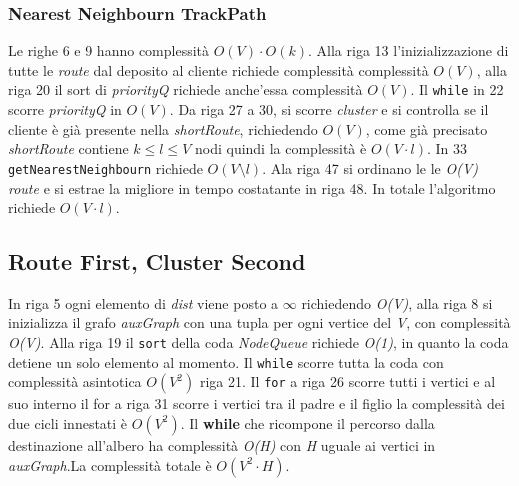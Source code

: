 \documentclass[]{article}
\begin{document}
\subsubsection{Nearest Neighbourn TrackPath}
Le righe 6 e 9 hanno complessità \emph{$O(V) \cdot O(k)$}. Alla riga 13 l'inizializzazione di tutte le \emph{route} dal deposito al cliente richiede complessità complessità \emph{$O(V)$}, alla riga  20 il sort di \textit{priorityQ} richiede anche'essa complessità \emph{$O(V)$}. Il \texttt{while} in 22 scorre \textit{priorityQ} in  \emph{$O(V)$}.
Da riga 27 a 30, si scorre \textit{cluster} e si controlla se il cliente è già presente nella \emph{shortRoute},  richiedendo   \emph{$O(V)$}, come già precisato \emph{shortRoute} contiene \emph{$ k \leq l \leq V$} nodi quindi la complessità  è \emph{$O(V \cdot l)$}. In 33 \texttt{getNearestNeighbourn} richiede \emph{$O(V \setminus l)$}. Ala riga 47 si ordinano le le \emph{O(V)} \emph{route} e si estrae la migliore in tempo costatante in riga 48. In totale l'algoritmo richiede \emph{$O(V \cdot l)$}.


\subsection{Route First, Cluster Second}
In riga 5 ogni elemento di \textit{dist} viene posto a $\infty$ richiedendo \emph{O(V)}, alla riga 8 si inizializza il grafo \textit{auxGraph} con una tupla per ogni vertice del \emph{V}, con complessità \emph{O(V)}. Alla riga 19 il \texttt{sort} della coda \textit{NodeQueue} richiede \emph{O(1)}, in quanto la coda detiene un solo elemento al momento.
Il \texttt{while} scorre tutta la coda con complessità asintotica \emph{$O(V^2)$} riga 21. Il \texttt{for} a riga 26 scorre tutti i vertici e al suo interno il for a riga 31 scorre i vertici tra il padre e il figlio la complessità dei due cicli innestati è \emph{$O(V^2)$}. Il \textbf{while} che ricompone il percorso dalla destinazione all'albero ha complessità \emph{O(H)} con \emph{H} uguale ai vertici in \textit{auxGraph}.La complessità totale è \emph{$O(V^2 \cdot H)$}.
\end{document}
